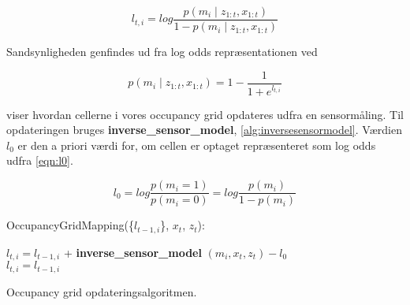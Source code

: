 \begin{equation}
l_{t,i} = log{ \frac{p(m_i \mid z_{1:t}, x_{1:t})}{1 - p(m_i \mid z_{1:t}, x_{1:t})}} 
\end{equation} 

Sandsynligheden genfindes ud fra log odds repræsentationen ved

\begin{equation}
	p(m_i \mid z_{1:t}, x_{1:t}) = 1 - \frac{1}{1 + e^{l_{t,i}}}
\end{equation} 

 viser hvordan cellerne i vores occupancy grid opdateres udfra en sensormåling. 
Til opdateringen bruges \textbf{inverse\_sensor\_model}, \cref{alg:inversesensormodel}.
Værdien $ l_0 $ er den a priori værdi for, om cellen er optaget repræsenteret som log odds udfra \cref{eqn:l0}.

\begin{equation}
  l_0 =  log \frac{p(m_i = 1)}{p(m_i = 0)} = log \frac{p(m_i)}{1- p(m_i)}
\end{equation} 

\begin{algorithm}[H]
\LinesNumbered
OccupancyGridMapping(\{$l_{t-1,i}$\}, $x_t$, $z_t$):

{
{ $ l_{t,i} = l_{t-1,i} $ + \textbf{inverse\_sensor\_model} $( m_i, x_t, z_t ) - l_0$\\ }
{ $ l_{t,i} = l_{t-1,i}  $\\ }
}
\caption{Occupancy grid opdateringsalgoritmen.}
\label{occupancygrid:alg}
\end{algorithm}




